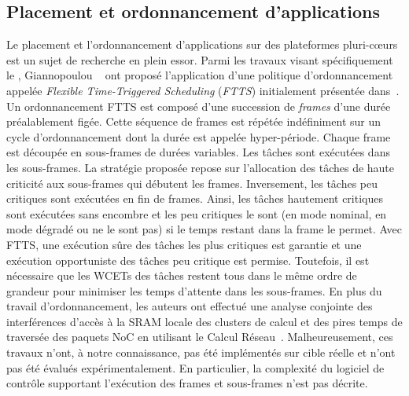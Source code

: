 \documentclass[main.tex]{subfiles}
\begin{document}
\subsection{Placement et ordonnancement d'applications}
Le placement et l'ordonnancement d'applications sur des plateformes pluri-c\oe{}urs est un sujet de recherche en plein essor. Parmi les travaux visant spécifiquement le \mppalong, Giannopoulou \etal~\cite{Giannopoulou2015} ont proposé l'application d'une politique d'ordonnancement appelée \emph{Flexible Time-Triggered Scheduling} (\emph{FTTS}) initialement présentée dans~\cite{Giannopoulou2013_EMSOFT}. Un ordonnancement FTTS est composé d'une succession de \emph{frames} d'une durée préalablement figée. Cette séquence de frames est répétée indéfiniment sur un cycle d'ordonnancement dont la durée est appelée hyper-période. Chaque frame est découpée en sous-frames de durées variables. Les tâches sont exécutées dans les sous-frames. La stratégie proposée repose sur l'allocation des tâches de haute criticité aux sous-frames qui débutent les frames. Inversement, les tâches peu critiques sont exécutées en fin de frames. Ainsi, les tâches hautement critiques sont exécutées sans encombre et les peu critiques le sont (en mode nominal, en mode dégradé ou ne le sont pas) si le temps restant dans la frame le permet. Avec FTTS, une exécution sûre des tâches les plus critiques est garantie et une exécution opportuniste des tâches peu critique est permise. Toutefois, il est nécessaire que les WCETs des tâches restent tous dans le même ordre de grandeur pour minimiser les temps d'attente dans les sous-frames. En plus du travail d'ordonnancement, les auteurs ont effectué une analyse conjointe des interférences d'accès à la SRAM locale des clusters de calcul et des pires temps de traversée des paquets NoC en utilisant le Calcul Réseau~\cite{LeBoudec2001, Cruz91}. Malheureusement, ces travaux n'ont, à notre connaissance, pas été implémentés sur cible réelle et n'ont pas été évalués expérimentalement. En particulier, la complexité du logiciel de contrôle supportant l'exécution des frames et sous-frames n'est pas décrite.
\end{document}
